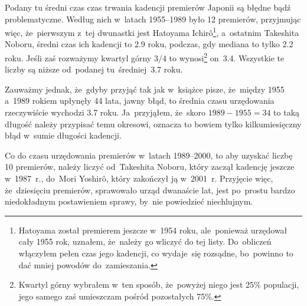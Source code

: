 \documentclass[a4paper,11pt]{article}
\begin{document}
\vspace{\spaceFour}


\start {} Podany tu średni czas czas trwania kadencji premierów
Japonii są błędne bądź problematyczne. Według nich w~latach 1955--1989
było 12 premierów, przyjmując więc, że~pierwszym z~tej dwunastki jest
Hatoyama Ichir\^{o}\footnote{Hatoyama został premierem jeszcze w~1954
  roku, ale~ponieważ urzędował cały 1955 rok, uznałem, że~należy go
  wliczyć do tej listy. Do~obliczeń włączyłem pełen czas jego
  kadencji, co wydaje~się rozsądne, bo~powinno to dać mniej powodów
  do~zamieszania.}, a~ostatnim Takeshita Noboru, średni czas ich
kadencji to 2.9 roku, podczas, gdy mediana to tylko 2.2 roku. Jeśli
zaś rozważymy kwartyl górny $3 / 4$ to wynosi\footnote{Kwartyl górny
  wybrałem w~ten sposób, że~powyżej niego jest 25\% populacji, jego
  samego zaś umieszczam pośród pozostałych 75\%.} on~3.4. Wszystkie te
liczby są niższe od~podanej tu~średniej~3.7 roku.

Zauważmy jednak, że~gdyby przyjąć tak jak w~książce pisze, że~między
1955 a~1989 rokiem upłynęły 44 lata, jawny błąd, to średnia czasu
urzędowania rzeczywiście wychodzi 3.7 roku. Ja~przyjąłem, że~skoro
$1989 - 1955 = 34$ to taką długość należy przypisać temu okresowi,
oznacza to bowiem tylko kilkumiesięczny błąd w~sumie długości
kadencji.

Co do czasu urzędowania premierów w~latach 1989--2000, to aby uzyskać
liczbę 10 premierów, należy liczyć od~Takeshita Noboru, który zaczął
kadencję jeszcze w~1987~r., do~Mori Yoshir\^{o}, który zakończył ją
w~2001~r. Przyjęcie więc, że~dziesięciu premierów, sprawowało urząd
dwanaście lat, jest po~prostu bardzo niedokładnym postawieniem sprawy,
by~nie powiedzieć niechlujnym.
\end{document}
